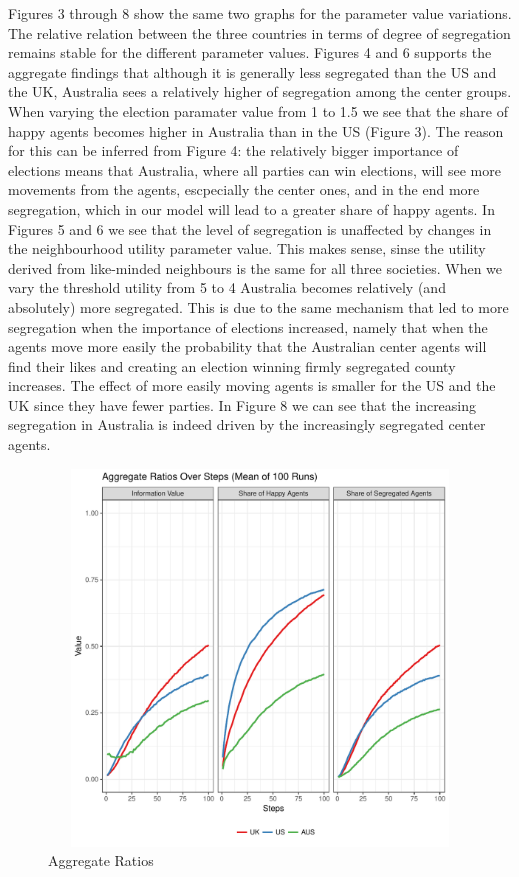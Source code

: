 \documentclass[12pt, a4paper]{article}
\begin{document}
Figures 3 through 8 show the same two graphs for the parameter value variations. The relative relation between the three countries in terms of degree of segregation remains stable for the different parameter values. Figures 4 and 6 supports the aggregate findings that although it is generally less segregated than the US and the UK, Australia sees a relatively higher of segregation among the center groups. When varying the election paramater value from 1 to 1.5 we see that the share of happy agents becomes higher in Australia than in the US (Figure 3). The reason for this can be inferred from Figure 4: the relatively bigger importance of elections means that Australia, where all parties can win elections, will see more movements from the agents, escpecially the center ones, and in the end more segregation, which in our model will lead to a greater share of happy agents. In Figures 5 and 6 we see that the level of segregation is unaffected by changes in the neighbourhood utility parameter value. This makes sense, sinse the utility derived from like-minded neighbours is the same for all three societies. When we vary the threshold utility from 5 to 4 Australia becomes relatively (and absolutely) more segregated. This is due to the same mechanism that led to more segregation when the importance of elections increased, namely that when the agents move more easily the probability that the Australian center agents will find their likes and creating an election winning firmly segregated county increases. The effect of more easily moving agents is smaller for the US and the UK since they have fewer parties. In Figure 8 we can see that the increasing segregation in Australia is indeed driven by the increasingly segregated center agents.        

\begin{figure}[bp!]
	\centering
	\caption{Aggregate Ratios}
	\includegraphics[height=10cm,width=16cm]{./Plots/all_agg_ratios.pdf}
\end{figure}
\end{document}
